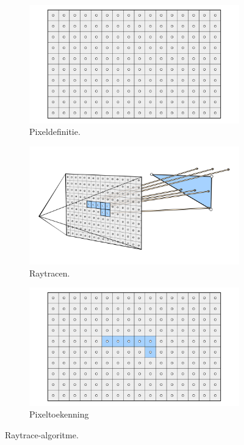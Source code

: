 \begin{figure}
  \centering
  \begin{subfigure}[b]{0.33\textwidth}
    \includegraphics[width=\textwidth]{./img/raw/rt-raytracing/raytrace1.png}
    \caption{Pixeldefinitie.}
    \label{fig:rt-raytracing:1}
  \end{subfigure}%
  \begin{subfigure}[b]{0.33\textwidth}
    \includegraphics[width=\textwidth]{./img/raw/rt-raytracing/raytrace2.png}
    \caption{Raytracen.}
    \label{fig:rt-raytracing:2}
  \end{subfigure}%
  \begin{subfigure}[b]{0.33\textwidth}
    \includegraphics[width=\textwidth]{./img/raw/rt-raytracing/raytrace3.png}
    \caption{Pixeltoekenning}
    \label{fig:rt-raytracing:3}
  \end{subfigure}%
  \caption{Raytrace-algoritme.}
  \label{fig:rt-raytracing}
\end{figure}
